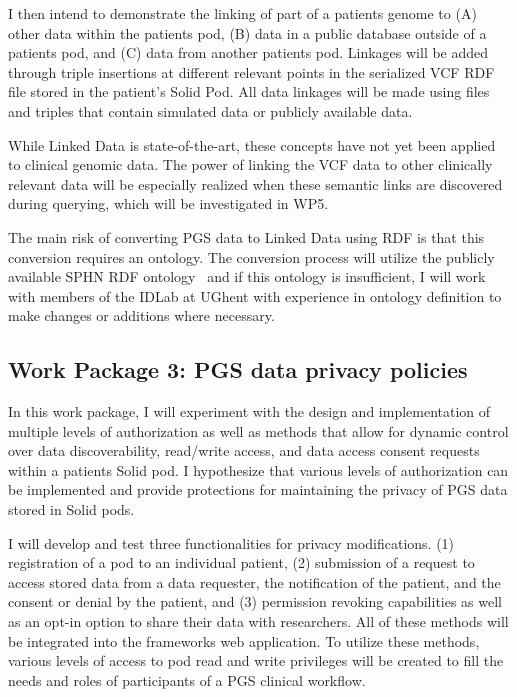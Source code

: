\documentclass[runningheads]{llncs}
\begin{document}
I then intend to demonstrate the linking of part of a patient\textquotesingle s genome to
(A) other data within the patient\textquotesingle s pod, 
(B) data in a public database outside of a patient\textquotesingle s pod, and
(C) data from another patient\textquotesingle s pod.
Linkages will be added through triple insertions at different relevant points in the serialized VCF RDF file stored in the patient's Solid Pod.
All data linkages will be made using files and triples that contain simulated data or publicly available data.

While Linked Data is state-of-the-art, these concepts have not yet been applied to clinical genomic data.
The power of linking the VCF data to other clinically relevant data will be especially realized when these semantic links are discovered during querying, which will be investigated in WP5. 

The main risk of converting PGS data to Linked Data using RDF is that this conversion requires an ontology. 
The conversion process will utilize the publicly available SPHN RDF ontology~\cite{van_der_horst_bridging_2023} and if this ontology is insufficient, I will work with members of the IDLab at UGhent with experience in ontology definition to make changes or additions where necessary.


\subsection{Work Package 3: PGS data privacy policies}

In this work package, I will experiment with the design and implementation of multiple levels of authorization as well as methods that allow for dynamic control over data discoverability, read/write access, and data access consent requests within a patient\textquotesingle s Solid pod. 
I hypothesize that various levels of authorization can be implemented and provide protections for maintaining the privacy of PGS data stored in Solid pods.

I will develop and test three functionalities for privacy modifications.
(1) registration of a pod to an individual patient,
(2) submission of a request to access stored data from a data requester, the notification of the patient, and the consent or denial by the patient, and
(3) permission revoking capabilities as well as an opt-in option to share their data with researchers. 
All of these methods will be integrated into the framework\textquotesingle s web application.
To utilize these methods, various levels of access to pod read and write privileges will be created to fill the needs and roles of participants of a PGS clinical workflow. 
\end{document}
